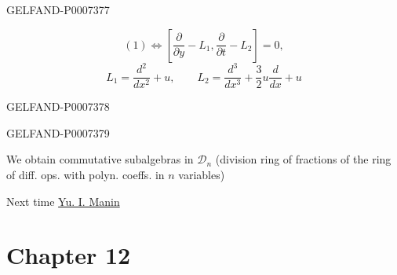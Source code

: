 \begin{GelfandAdjacentEvidence}{GELFAND-P000737}{7}


\[
(1)\Longleftrightarrow
\left[\frac{\partial}{\partial y}-L_1,\frac{\partial}{\partial t}-L_2\right]=0,
\]
\[
L_1=\frac{d^2}{dx^2}+u,\qquad
L_2=\frac{d^3}{dx^3}+\frac32u\frac{d}{dx}+u
\]
\end{GelfandAdjacentEvidence}
\begin{GelfandAdjacentEvidence}{GELFAND-P000737}{8}

\end{GelfandAdjacentEvidence}
\begin{GelfandAdjacentEvidence}{GELFAND-P000737}{9}


We obtain commutative subalgebras in \(\mathcal D_n\) (division ring of fractions of the ring of diff. ops. with polyn. coeffs. in \(n\) variables)

Next time \underline{Yu. I. Manin}
\end{GelfandAdjacentEvidence}



\clearpage{}
\section*{Chapter 12}


